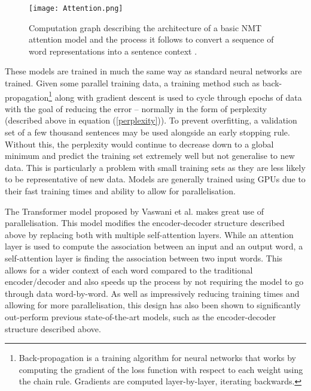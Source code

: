 \documentclass[11pt]{article}
\begin{document}
\bigskip

\begin{figure}[h]
    \centering
    \texttt{[image: Attention.png]}
    \caption{Computation graph describing the architecture of a basic NMT attention model and the process it follows to convert a sequence of word representations into a sentence context \citep[p. 130]{koehn2020}.}
    \label{fig:attention}
\end{figure}

\bigskip

These models are trained in much the same way as standard neural networks are trained. Given some parallel training data, a training method such as back-propagation\footnote{Back-propagation is a training algorithm for neural networks that works by computing the gradient of the loss function with respect to each weight using the chain rule. Gradients are computed layer-by-layer, iterating backwards.} along with gradient descent is used to cycle through epochs of data with the goal of reducing the error -- normally in the form of perplexity (described above in equation (\ref{perplexity})). %
To prevent overfitting, a validation set of a few thousand sentences may be used alongside an early stopping rule. Without this, the perplexity would continue to decrease down to a global minimum and predict the training set extremely well but not generalise to new data. This is particularly a problem with small training sets as they are less likely to be representative of new data. Models are generally trained using GPUs due to their fast training times and ability to allow for parallelisation. 

\bigskip

The Transformer model proposed by Vaswani et al. \citeyearpar{vaswani2017attention} makes great use of parallelisation. This model modifies the encoder-decoder structure described above by replacing both with multiple self-attention layers. While an attention layer is used to compute the association between an input and an output word, a self-attention layer is finding the association between two input words. This allows for a wider context of each word compared to the traditional encoder/decoder and also speeds up the process by not requiring the model to go through data word-by-word. As well as impressively reducing training times and allowing for more parallelisation, this design has also been shown to significantly out-perform previous state-of-the-art models, such as the encoder-decoder structure described above.
\end{document}
